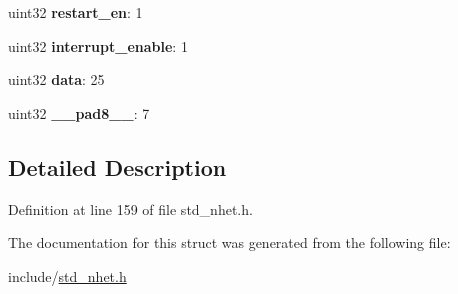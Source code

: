 \begin{DoxyCompactItemize}
uint32 {\bfseries restart\+\_\+en}\+: 1
\item 
\mbox{\label{structscmp__format_ac42c8c25de75bd2900f2da0efeb2d210}} 
uint32 {\bfseries interrupt\+\_\+enable}\+: 1
\item 
\mbox{\label{structscmp__format_a712f8a38c58b10ba6a655371b38dabf8}} 
uint32 {\bfseries data}\+: 25
\item 
\mbox{\label{structscmp__format_aaca90903b938c22a03881d60971d24c4}} 
uint32 {\bfseries \+\_\+\+\_\+pad8\+\_\+\+\_\+}\+: 7
\end{DoxyCompactItemize}


\subsection{Detailed Description}


Definition at line 159 of file std\+\_\+nhet.\+h.



The documentation for this struct was generated from the following file\+:\begin{DoxyCompactItemize}
\item 
include/\mbox{\hyperlink{std__nhet_8h}{std\+\_\+nhet.\+h}}\end{DoxyCompactItemize}
